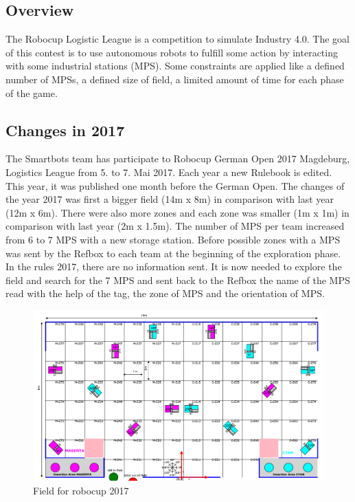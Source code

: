 \subsection{Overview}

The Robocup Logistic League is a competition to simulate Industry 4.0.  The goal of this contest is to use autonomous robots to fulfill some action by interacting with some industrial stations (MPS). Some constraints are applied like a defined number of MPSs, a defined size of field, a limited amount of time for each phase of the game. 

\subsection{Changes in 2017}

The Smartbots team has participate to Robocup German Open 2017 Magdeburg, Logistics League from 5. to 7. Mai 2017. Each year a new Rulebook is edited. This year, it was published one month before the German Open. The changes of the year 2017 was first a bigger field (14m x 8m) in comparison with last year (12m x 6m). There were also more zones and each zone was smaller (1m x 1m) in comparison with last year (2m x 1.5m). The number of MPS per team increased from 6 to 7 MPS with a new storage station. Before possible zones with a MPS was sent by the Refbox to each team at the beginning of the exploration phase. In the rules 2017, there are no information sent. It is now needed to explore the field and search for the 7 MPS and sent back to the Refbox the name of the MPS read with the help of the tag, the zone of MPS and the orientation of MPS. 

\begin{figure}%
\centering
\includegraphics[width=\linewidth]{pic/field.png}
\caption{Field for robocup 2017}
\label{fig:frog}
\end{figure}

